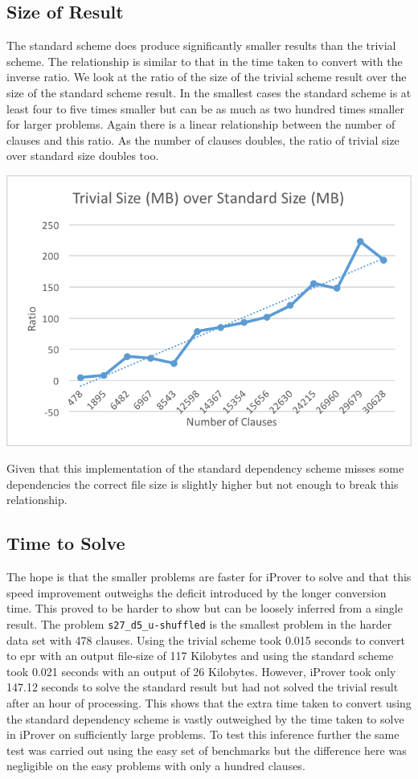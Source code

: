\subsection{Size of Result}
The standard scheme does produce significantly smaller results than the trivial scheme. The relationship is similar to that in the time taken to convert with the inverse ratio. We look at the ratio of the size of the trivial scheme result over the size of the standard scheme result. In the smallest cases the standard scheme is at least four to five times smaller but can be as much as two hundred times smaller for larger problems. Again there is a linear relationship between the number of clauses and this ratio. As the number of clauses doubles, the ratio of trivial size over standard size doubles too.

\begin{center}
\includegraphics{trivialsizeoverstandardsize.png}
\end{center}

Given that this implementation of the standard dependency scheme misses some dependencies the correct file size is slightly higher but not enough to break this relationship.

\subsection{Time to Solve} \label{tvsstdsolve}
The hope is that the smaller problems are faster for iProver to solve and that this speed improvement outweighs the deficit introduced by the longer conversion time. This proved to be harder to show but can be loosely inferred from a single result. The problem \texttt{s27\_d5\_u-shuffled} is the smallest problem in the harder data set with 478 clauses. Using the trivial scheme took 0.015 seconds to convert to \gls{epr} with an output file-size of 117 Kilobytes and using the standard scheme took 0.021 seconds with an output of 26 Kilobytes. However, iProver took only 147.12 seconds to solve the standard result but had not solved the trivial result after an hour of processing. This shows that the extra time taken to convert using the standard dependency scheme is vastly outweighed by the time taken to solve in iProver on sufficiently large problems. To test this inference further the same test was carried out using the easy set of benchmarks but the difference here was negligible on the easy problems with only a hundred clauses.

